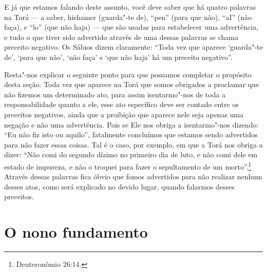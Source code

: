 E já que estamos falando deste assunto, você deve saber que há quatro
palavras na Torá\starr{} --- a saber, hishamer\starr{} (guarda"-te de), ``pen''
(para que não), ``aI'' (não faça), e ``lo'' (que não haja) --- que são
usadas para estabelecer uma advertência, e tudo o que tiver sido
advertido através de uma dessas palavras se chama preceito negativo. Os
Sábios dizem claramente: ``Toda vez que aparece `guarda"-te de', `para
que não', `não faça' e `que não haja' há um preceito negativo''.

Resta"-nos explicar o seguinte ponto para que possamos completar o
propósito desta seção. Toda vez que aparece na Torá\starr{} que somos obrigados
a proclamar que não fizemos um determinado ato, para assim isentarmo"-nos
de toda a responsabilidade quanto a ele, esse ato específico deve ser
contado entre os preceitos negativos, ainda que a proibição que aparece
nele seja apenas uma negação e não uma advertência. Pois se Ele nos
obriga a isentarmo"-nos dizendo: ``Eu não fiz isto ou aquilo'',
fatalmente concluímos que estamos sendo advertidos para não fazer essas
coisas. Tal é o caso, por exemplo, em que a Torá\starr{} nos obriga a dizer:
``Não comi do segundo dízimo no primeiro dia de luto, e não comi dele em
estado de impureza, e não o troquei para fazer o sepultamento de um
morto''.\footnote{Deuteronômio 26:14.} Através dessas palavras fica óbvio que
fomos advertidos para não realizar nenhum desses atos, como será
explicado no devido lugar, quando falarmos desses preceitos.

\chapter*{O nono fundamento}

